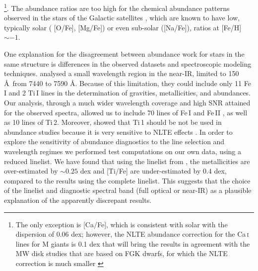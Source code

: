 \documentclass[galaxies,article,submit,moreauthors,pdftex,10pt,a4paper]{mdpi}
\newcommand{\ion}[2]{#1\,\textsc{#2}}
\begin{document}
\footnote{The only exception is [Ca/Fe], which is consistent with solar with the dispersion of 0.06 dex; however, the NLTE abundance correction for the \ion{Ca}{i} lines for M giants is 0.1 dex that will bring the results in agreement with the MW disk studies that are based on FGK dwarfs, for which the NLTE correction is much smaller \cite{Merle2011}}.
The abundance ratios are too high for the chemical abundance patterns observed in the stars of the Galactic satellites \cite{Bonifacio:2000,shetrone2001,shetrone2003,Tolstoy:2009,deBoer:2014}, which are known to have low, typically solar ( [O/Fe], [Mg/Fe]) or even sub-solar ([Na/Fe]), ratios at [Fe/H] $\sim -1$.


One explanation for the disagreement between abundance work for stars in the same structure is
differences in the observed datasets and spectroscopic modeling techniques.
\cite{chou2010b} analysed a small wavelength region in the near-IR, limited to 150 \AA\ from 7440 to 7590 \AA. Because of this limitation, they could include only 11 \ion{Fe}{I} and 2 \ion{Ti}{I} lines in the determination of gravities, metallicities, and abundances. Our analysis, through a much wider wavelength coverage and high SNR attained for the observed spectra, allowed us to include 70 lines of \ion{Fe}{I} and \ion{Fe}{II} \cite{bergemann2012}, as well as 10 lines of \ion{Ti}{2}. Moreover,  \cite{bergemann2011} showed that \ion{Ti}{1} should be not be used in abundance studies because it is very sensitive to NLTE effects .
In order to explore the sensitivity of abundance diagnostics to the line selection and wavelength regimes we performed test computations on our own data, using a reduced linelist. We have found that using the linelist from \cite{chou2010a}, the metallicities are over-estimated by $\sim 0.25$ dex and [Ti/Fe] are under-estimated by $0.4$ dex, compared to the results using the complete linelist. This suggests that the choice of the linelist and diagnostic spectral band (full optical or near-IR) as a plausible explanation  of the apparently discrepant results.
\end{document}
